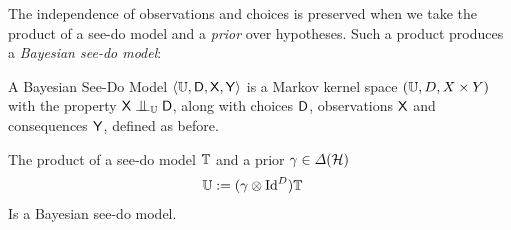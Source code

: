 
The independence of observations and choices is preserved when we take the product of a see-do model and a \emph{prior} over hypotheses. Such a product produces a \emph{Bayesian see-do model}:

\begin{definition}
A Bayesian See-Do Model $\langle\mathbb{U},\mathsf{D},\mathsf{X},\mathsf{Y}\rangle$ is a Markov kernel space $(\mathbb{U},D,X\times Y)$ with the property $\RV{X}\CI_{\kernel{U}}\RV{D}$, along with choices $\mathsf{D}$, observations $\mathsf{X}$ and consequences $\mathsf{Y}$, defined as before.
\end{definition}

\begin{theorem}
The product of a see-do model $\mathbb{T}$ and a prior $\gamma\in \Delta(\mathcal{H})$
\begin{align}
    \mathbb{U} &:= (\gamma\otimes \mathrm{Id}^D)\mathbb{T}
\end{align}
Is a Bayesian see-do model.
\end{theorem}

